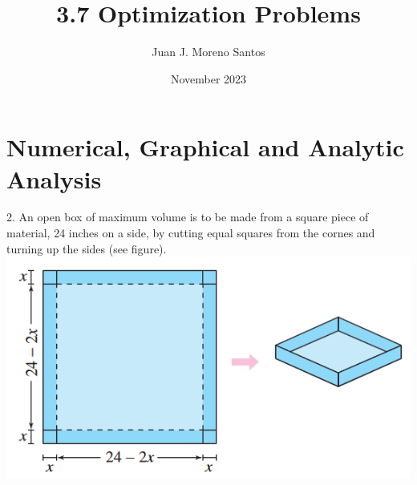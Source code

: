 \documentclass[11pt]{article}
\begin{document}
\title{3.7 Optimization Problems}
\author{Juan J. Moreno Santos}
\date{November 2023}

\maketitle
\section{Numerical, Graphical and Analytic Analysis}
2. An open box of maximum volume is to be made from a square piece of material, 24 inches on a side, by cutting equal squares from the cornes and turning up the sides (see figure).\\
\includegraphics{2.png}\\
\end{document}
